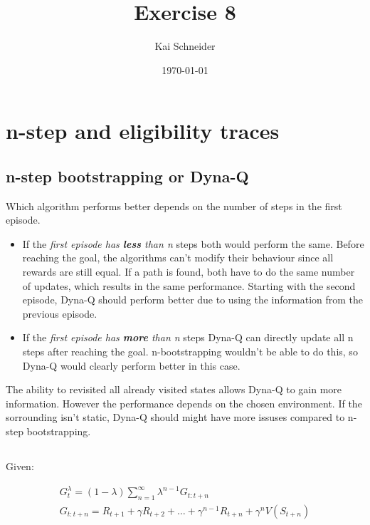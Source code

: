 \documentclass[11pt,a4paper]{article}
\title{Exercise 8}
\author{Kai Schneider}
\date{\today}
\begin{document}
 

\maketitle

\section{n-step and eligibility traces}

\subsection{ n-step bootstrapping or Dyna-Q}

Which algorithm performs better depends on the number of steps in the first episode.

\begin{itemize}
  \item If the \textit{first episode has \textbf{less} than n} steps both would perform the same. 
        Before reaching the goal, the algorithms can't modify their behaviour since all rewards are still equal.
        If a path is found, both have to do the same number of updates, which results in the same performance.
        Starting with the second episode, Dyna-Q should perform better due to using the information from the previous episode.

  \item If the \textit{first episode has \textbf{more} than n} steps Dyna-Q can directly update all n steps after reaching the
        goal. n-bootstrapping wouldn't be able to do this, so Dyna-Q would clearly perform better in this case. 
\end{itemize}

\flushleft
The ability to revisited all already visited states allows Dyna-Q to gain more information.
However the performance depends on the chosen environment. If the sorrounding isn't static, Dyna-Q should might 
have more issuses compared to n-step bootstrapping.

\newpage

\subsection{}

Given:

\begin{align}
    G_{t}^{\lambda} = (1-\lambda) \sum_{n=1}^{\infty} \lambda^{n-1} G_{t:t+n} \\
    G_{t:t+n} = R_{t+1} + \gamma R_{t+2} + \dots + \gamma^{n-1} R_{t+n} + \gamma^{n} V(S_{t+n})
\end{align}
\end{document}
